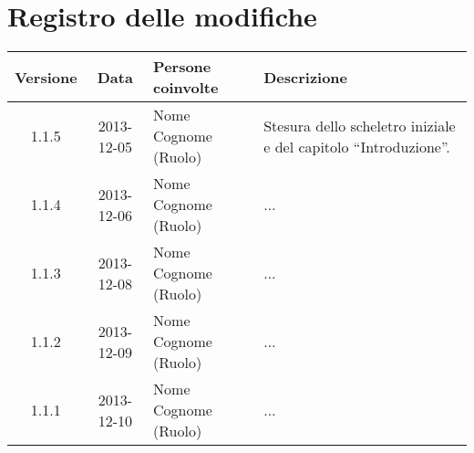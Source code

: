 \section*{Registro delle modifiche}

\small{
\begin{tabularx}{\textwidth}{|c|c|l|X|}
 \hline \textbf{Versione} & \textbf{Data} & \textbf{Persone coinvolte} & \textbf{Descrizione} \\

 
 \hline 1.1.5 & 2013-12-05 & Nome Cognome (Ruolo) &
 Stesura dello scheletro iniziale e del capitolo ``Introduzione''.\\

 \hline 1.1.4 & 2013-12-06 & Nome Cognome (Ruolo) &
 ...\\

 \hline 1.1.3 & 2013-12-08 & Nome Cognome (Ruolo) &
 ...\\

 \hline 1.1.2 & 2013-12-09 & Nome Cognome (Ruolo) &
 ...\\

 \hline 1.1.1 & 2013-12-10 & Nome Cognome (Ruolo) &
 ...\\

 \hline
\end{tabularx}
}
